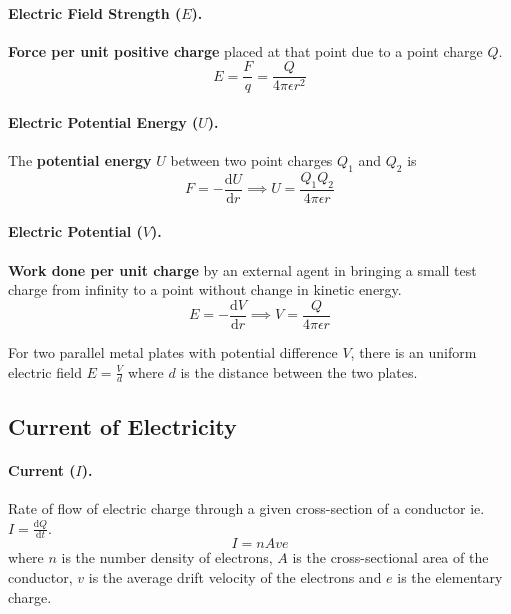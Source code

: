 \documentclass{article}
\begin{document}
\paragraph{Electric Field Strength ($E$).} \textbf{Force per unit positive charge} placed at that point due to a point charge $Q$. \begin{equation}
E = \frac{F}{q} = \frac{Q}{4\pi\epsilon r^2}
\end{equation}

\paragraph{Electric Potential Energy ($U$).} The \textbf{potential energy} $U$ between two point charges $Q_1$ and $Q_2$ is \begin{equation}
F = -\frac{\mathrm{d}U}{\mathrm{d}r} \implies U = \frac{Q_1Q_2}{4\pi\epsilon r}
\end{equation}

\paragraph{Electric Potential ($V$).} \textbf{Work done per unit charge} by an external agent in bringing a small test charge from infinity to a point without change in kinetic energy. \begin{equation}
E = -\frac{\mathrm{d}V}{\mathrm{d}r} \implies V = \frac{Q}{4\pi\epsilon r}
\end{equation}

For two parallel metal plates with potential difference $V$, there is an uniform electric field $E = \frac{V}{d}$ where $d$ is the distance between the two plates.

\subsection{Current of Electricity}

\paragraph{Current ($I$).} Rate of flow of electric charge through a given cross-section of a conductor ie. $I = \frac{\mathrm{d}{Q}}{\mathrm{d}t}$. \begin{equation}
I = nAve
\end{equation} where $n$ is the number density of electrons, $A$ is the cross-sectional area of the conductor, $v$ is the average drift velocity of the electrons and $e$ is the elementary charge.
\end{document}
